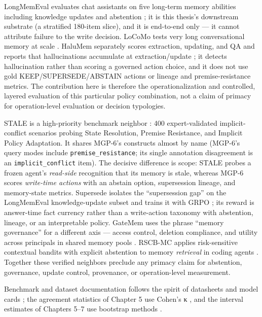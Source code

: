 LongMemEval evaluates chat assistants on five long-term memory abilities
including knowledge updates and abstention \citep{wu2025longmemeval}; it
is this thesis's downstream substrate (a stratified 180-item slice), and
it is end-to-end only --- it cannot attribute failure to the write
decision. LoCoMo tests very long conversational memory at scale
\citep{maharana2024locomo}. HaluMem separately scores extraction,
updating, and QA and reports that hallucinations accumulate at
extraction/update \citep{halumem2025}; it detects hallucination rather
than scoring a governed action choice, and it does not use gold
KEEP/SUPERSEDE/ABSTAIN actions or lineage and premise-resistance
metrics. The contribution here is therefore the operationalization and
controlled, layered evaluation of this particular policy combination,
not a claim of primacy for operation-level evaluation or decision
typologies.

STALE is a high-priority benchmark neighbor \citep{chao2026stale}: 400
expert-validated implicit-conflict scenarios probing State Resolution,
Premise Resistance, and Implicit Policy Adaptation. It shares MGP-6's
constructs almost by name (MGP-6's query modes include
\texttt{premise\_resistance}; its single annotation disagreement is an
\texttt{implicit\_conflict} item). The decisive difference is scope:
STALE probes a frozen agent's \emph{read-side} recognition that its
memory is stale, whereas MGP-6 scores \emph{write-time actions} with an
abstain option, supersession lineage, and memory-state metrics.
Supersede isolates the ``supersession gap'' on the LongMemEval
knowledge-update subset and trains it with GRPO
\citep{patel2026supersede}; its reward is answer-time fact currency
rather than a write-action taxonomy with abstention, lineage, or an
interpretable policy. GateMem uses the phrase ``memory governance'' for
a different axis --- access control, deletion compliance, and utility
across principals in shared memory pools \citep{ren2026gatemem}. RSCB-MC
applies risk-sensitive contextual bandits with explicit abstention to
memory \emph{retrieval} in coding agents \citep{iscan2026remember}.
Together these verified neighbors preclude any primacy claim for
abstention, governance, update control, provenance, or operation-level
measurement.

Benchmark and dataset documentation follows the spirit of datasheets and
model cards \citep{gebru2021datasheets, mitchell2019modelcards}; the
agreement statistics of Chapter 5 use Cohen's κ
\citep{cohen1960coefficient}, and the interval estimates of Chapters
5--7 use bootstrap methods \citep{efron1993bootstrap}.

